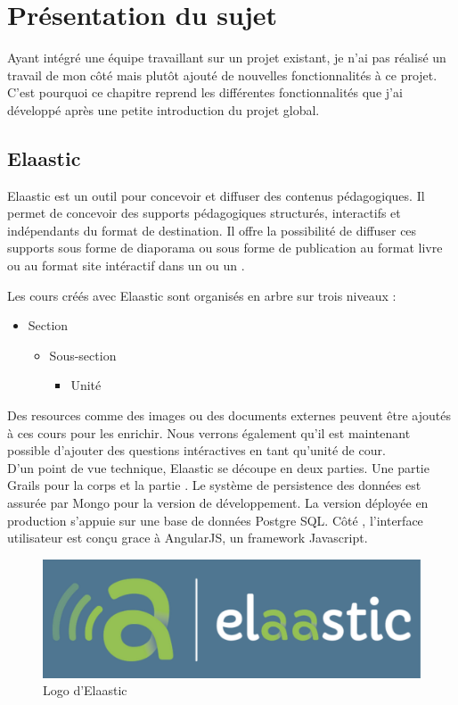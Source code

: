 \chapter{Présentation du sujet}
Ayant intégré une équipe travaillant sur un projet existant, je n'ai pas réalisé
un travail de mon côté mais plutôt ajouté de nouvelles fonctionnalités à ce
projet. C'est pourquoi ce chapitre reprend les différentes fonctionnalités que
j'ai développé après une petite introduction du projet global.

\section{Elaastic}
Elaastic est un outil pour concevoir et diffuser des contenus pédagogiques. Il
permet de concevoir des supports pédagogiques structurés, interactifs et
indépendants du format de destination. Il offre la possibilité de diffuser ces
supports sous forme de diaporama ou sous forme de publication au format livre ou
au format site intéractif dans un  ou un .

Les cours créés avec Elaastic sont organisés en arbre sur trois niveaux :
\begin{itemize}
  \item Section
	\begin{itemize}
	  \item Sous-section
		\begin{itemize}
		  \item Unité
		\end{itemize}
	\end{itemize}
\end{itemize}

Des resources comme des images ou des documents externes peuvent être ajoutés à
ces cours pour les enrichir. Nous verrons également qu'il est maintenant
possible d'ajouter des questions intéractives en tant qu'unité de cour.\\

D'un point de vue technique, Elaastic se découpe en deux parties. Une partie
Grails pour la corps et la partie . Le système de persistence
des données est assurée par Mongo pour la version de développement. La version
déployée en production s'appuie sur une base de données Postgre SQL. Côté
, l'interface utilisateur est conçu grace à AngularJS, un
framework Javascript.

\begin{figure}[h]
  \centering
  \includegraphics[scale=0.4]{images/elaastic_blue.pdf}%
  \caption{Logo d'Elaastic}
  \label{fig:elaastic}
\end{figure}

